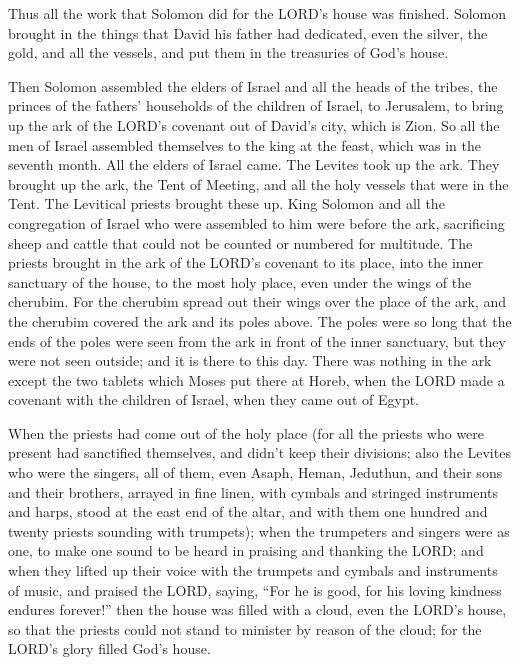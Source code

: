  Thus all the work that Solomon did for the LORD's house
was finished. Solomon brought in the things that David his father had
dedicated, even the silver, the gold, and all the vessels, and put them
in the treasuries of God's house.

 Then Solomon assembled the elders of Israel and all the
heads of the tribes, the princes of the fathers' households of the
children of Israel, to Jerusalem, to bring up the ark of the LORD's
covenant out of David's city, which is Zion.  So all the
men of Israel assembled themselves to the king at the feast, which was
in the seventh month.  All the elders of Israel came. The
Levites took up the ark.  They brought up the ark, the
Tent of Meeting, and all the holy vessels that were in the Tent. The
Levitical priests brought these up.  King Solomon and all
the congregation of Israel who were assembled to him were before the
ark, sacrificing sheep and cattle that could not be counted or numbered
for multitude.  The priests brought in the ark of the
LORD's covenant to its place, into the inner sanctuary of the house, to
the most holy place, even under the wings of the cherubim.
 For the cherubim spread out their wings over the place of
the ark, and the cherubim covered the ark and its poles above.
 The poles were so long that the ends of the poles were
seen from the ark in front of the inner sanctuary, but they were not
seen outside; and it is there to this day.  There was
nothing in the ark except the two tablets which Moses put there at
Horeb, when the LORD made a covenant with the children of Israel, when
they came out of Egypt.

 When the priests had come out of the holy place (for all
the priests who were present had sanctified themselves, and didn't keep
their divisions;  also the Levites who were the singers,
all of them, even Asaph, Heman, Jeduthun, and their sons and their
brothers, arrayed in fine linen, with cymbals and stringed instruments
and harps, stood at the east end of the altar, and with them one hundred
and twenty priests sounding with trumpets);  when the
trumpeters and singers were as one, to make one sound to be heard in
praising and thanking the LORD; and when they lifted up their voice with
the trumpets and cymbals and instruments of music, and praised the LORD,
saying, ``For he is good, for his loving kindness endures forever!''
then the house was filled with a cloud, even the LORD's house,
 so that the priests could not stand to minister by
reason of the cloud; for the LORD's glory filled God's house.

